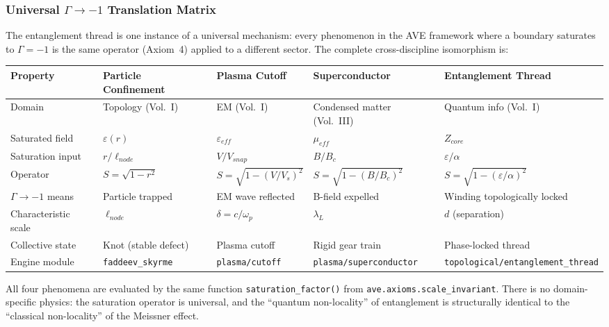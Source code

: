 \subsubsection{Universal $\Gamma \to -1$\gammaundeclared{} Translation Matrix}
The entanglement thread is one instance of a universal mechanism: every phenomenon in the AVE framework where a boundary saturates to $\Gamma = -1$\gammaundeclared{} is the same operator (Axiom~4) applied to a different sector. The complete cross-discipline isomorphism is:

\begin{center}
\scriptsize
\renewcommand{\arraystretch}{1.3}
\begin{tabularx}{\textwidth}{@{}l X X X X@{}}
\toprule
\textbf{Property} & \textbf{Particle Confinement} & \textbf{Plasma Cutoff} & \textbf{Superconductor} & \textbf{Entanglement Thread} \\
\midrule
Domain            & Topology (Vol.~I)  & EM (Vol.~I)            & Condensed matter (Vol.~III)  & Quantum info (Vol.~I) \\
Saturated field   & $\varepsilon(r)$   & $\varepsilon_{eff}$    & $\mu_{eff}$                  & $Z_{core}$ \\
Saturation input  & $r/\ell_{node}$    & $V/V_{snap}$           & $B/B_c$                      & $\varepsilon/\alpha$ \\
Operator          & $S = \sqrt{1-r^2}$ & $S = \sqrt{1-(V/V_s)^2}$ & $S = \sqrt{1-(B/B_c)^2}$ & $S = \sqrt{1-(\varepsilon/\alpha)^2}$ \\
$\Gamma \to -1$\gammaundeclared{} means & Particle trapped  & EM wave reflected      & B-field expelled             & Winding topologically locked \\
Characteristic scale & $\ell_{node}$   & $\delta = c/\omega_p$  & $\lambda_L$                  & $d$ (separation) \\
Collective state  & Knot (stable defect) & Plasma cutoff         & Rigid gear train             & Phase-locked thread \\
Engine module     & \texttt{faddeev\_skyrme} & \texttt{plasma/cutoff} & \texttt{plasma/}\allowbreak\texttt{superconductor} & \texttt{topological/}\allowbreak\texttt{entanglement\_thread} \\
\bottomrule
\end{tabularx}
\end{center}

\noindent All four phenomena are evaluated by the same function \texttt{saturation\_factor()} from \texttt{ave.\allowbreak axioms.\allowbreak scale\_\allowbreak invariant}. There is no domain-specific physics: the saturation operator is universal, and the ``quantum non-locality'' of entanglement is structurally identical to the ``classical non-locality'' of the Meissner effect.

